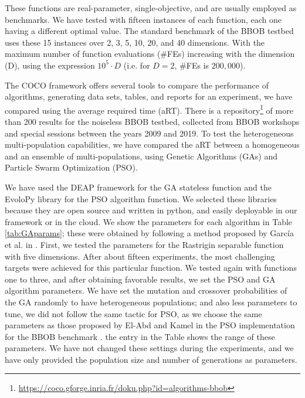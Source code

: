 \documentclass[runningheads]{llncs}
\begin{document}
These functions are real-parameter, single-objective, and are
usually employed as benchmarks. We have tested with fifteen instances of each
function, each one having a different optimal value. The standard benchmark of
the BBOB testbed %
uses these 15 instances over 2, 3, 5, 10, 20, and
40 dimensions. With the maximum number of function evaluations (\#FEs)
increasing with the dimension (D), using the expression $10^5 \cdot D$ (i.e.
for $D = 2$, \#FEs is $200,000$).

The COCO framework offers several tools to compare the performance of
algorithms, generating data sets, tables, and reports for an experiment, we have
compared  using the average required time (aRT). There is a
repository\footnote{\url{https://coco.gforge.inria.fr/doku.php?id=algorithms-bbob}}
of more than 200 results for the noiseless BBOB testbed, collected from BBOB
workshops and special sessions between the years 2009 and 2019. To test the
heterogeneous multi-population capabilities, we have compared the aRT between a
homogeneous and an ensemble of multi-populations, using Genetic Algorithms
(GAs) and Particle Swarm Optimization (PSO).

We have used the DEAP framework for the
GA stateless function \cite{fortin2012deap} and the EvoloPy library
\cite{faris2016evolopy} for the PSO algorithm function. 
We selected these libraries because they are open source
and written in python, and easily deployable in our 
framework or in the cloud.  %
We show the parameters for each algorithm in Table \ref{tab:GAparams};
these were obtained by following a
method proposed by García et al. in \cite{garcia2017benchmarking:anon}. First, we
tested the parameters for the Rastrigin separable function with five
dimensions. After about fifteen experiments, the most challenging targets were
achieved for this particular function. We tested again with functions one to
three, and after obtaining favorable results, we set the PSO and GA algorithm
parameters. We have set the mutation and crossover probabilities of the GA randomly
to have heterogeneous populations; and also less parameters to tune,
we did not follow the same tactic for PSO, as we choose the same parameters
as those proposed by El-Abd and Kamel in the PSO implementation for the BBOB benchmark \cite{el2009black}.   %
the entry in the Table shows the range of these
parameters. We have not changed these settings during the experiments, and we have
only provided the population size and number of generations as parameters.
\end{document}
